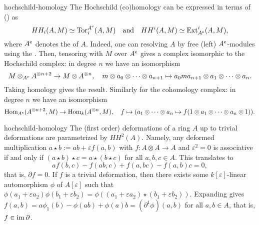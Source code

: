 \begin{example}{hochschild-homology}
    The Hochschild (co)homology can be expressed in terms of  () as
    \[ HH_i(A, M) \simeq \text{Tor}_i^{A^\textup{e}}(A, M) \quad \text{and} \quad HH^i(A, M) \simeq \text{Ext}^i_{A^\textup{e}}(A, M) , \]
    where $A^\textup{e}$ denotes the  of $A$. Indeed, one can resolving $A$ by free (left) $A^\textup{e}$-modules using the . Then, tensoring with $M$ over $A^\textup{e}$ gives a complex isomorphic to the Hochschild complex: in degree $n$ we have an isomorphism
    \[ M \otimes_{A^\textup{e}} A^{\otimes n + 2} \to M \otimes A^{\otimes n}, \quad m \otimes a_0 \otimes \cdots \otimes a_{n + 1} \mapsto a_0 m a_{n + 1} \otimes a_1 \otimes \cdots \otimes a_n . \]
    Taking homology gives the result. Similarly for the cohomology complex: in degree $n$ we have an isomorphism
    \[ \text{Hom}_{A^\textup{e}}(A^{\otimes n + 2}, M) \to \text{Hom}_k(A^{\otimes n}, M), \quad f \mapsto (a_1 \otimes \cdots \otimes a_n \mapsto f(1 \otimes a_1 \otimes \cdots \otimes a_n \otimes 1)) . \]
\end{example}


\begin{example}{hochschild-homology}
    The (first order) deformations of a ring $A$ up to trivial deformations are parametrized by $HH^2(A)$. Namely, any deformed multiplication $a \star b := ab + \varepsilon f(a, b)$ with $f : A \otimes A \to A$ and $\varepsilon^2 = 0$ is associative if and only if $(a \star b) \star c = a \star (b \star c)$ for all $a, b, c \in A$. This translates to
    \[ a f(b, c) - f(ab, c) + f(a, bc) - f(a, b) c = 0 , \]
    that is, $\partial f = 0$. If $f$ is a trivial deformation, then there exists some $k[\varepsilon]$-linear automorphism $\phi$ of $A[\varepsilon]$ such that $\phi(a_1 + \varepsilon a_2) \phi(b_1 + \varepsilon b_2) = \phi((a_1 + \varepsilon a_2) \star (b_1 + \varepsilon b_2))$. Expanding gives $f(a, b) = a \phi_1(b) - \phi(ab) + \phi(a) b = (\partial^1 \phi)(a, b)$ for all $a, b \in A$, that is, $f \in \operatorname{im} \partial$.
\end{example}

